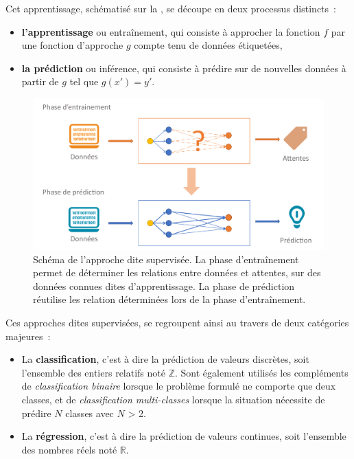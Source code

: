 Cet apprentissage, schématisé sur la , se découpe en deux processus distincts~:
\begin{itemize}
    \item \textbf{l’apprentissage} ou entraînement, qui consiste à approcher la fonction $f$ par une fonction d’approche $g$ compte tenu de données étiquetées,
    \item \textbf{la prédiction} ou inférence, qui consiste à prédire sur de nouvelles données à partir de $g$ tel que $g(x') = y'$.
\end{itemize}\par

\begin{figure}[H]
    \centering
    \includegraphics[width=0.8\linewidth]{contents/chapter_3/resources/scheme_supervised_classification.pdf}
    \caption{Schéma de l’approche dite supervisée. La phase d'entraînement permet de déterminer les relations entre données et attentes, sur des données connues dites d'apprentissage. La phase de prédiction réutilise les relation déterminées lors de la phase d'entraînement. }
    \label{fig:scheme_supervised_classification}
\end{figure}

Ces approches dites supervisées, se regroupent ainsi au travers de deux catégories majeures~:
\begin{itemize}
    \item La \textbf{classification}, c'est à dire la prédiction de valeurs discrètes, soit l’ensemble des entiers relatifs noté $\pmb{\mathbb{Z}}$. Sont également utilisés les compléments de \textit{classification binaire} lorsque le problème formulé ne comporte que deux classes, et de \textit{classification multi-classes} lorsque la situation nécessite de prédire $N$ classes avec $N$ > 2.
    \item La \textbf{régression}, c'est à dire la prédiction de valeurs continues, soit l’ensemble des nombres réels noté $\pmb{\mathbb{R}}$.
\end{itemize}\par

